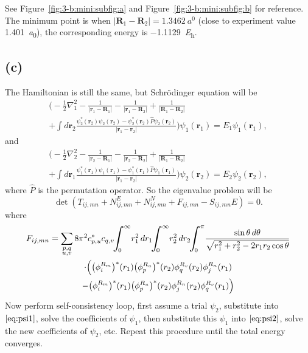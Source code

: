 See Figure~\ref{fig:3-b:mini:subfig:a} and Figure~\ref{fig:3-b:mini:subfig:b}
for reference. The minimum point is when
$\lvert \symbf{R}_1- \symbf{R}_2 \rvert = \qty{1.3462}{\bohr}$
(close to experiment value \qty{1.401}{\bohr}), the corresponding energy is \qty{-1.1129}{\hartree}.

\subsection*{(c)}

The Hamiltonian is still the same, but Schrödinger equation will be
%
\begin{multline}\label{eq:psi1}
    \biggl(-\frac{1}{2}\nabla_1^2
    - \frac{1}{\lvert \symbf{r}_1 - \symbf{R}_1 \rvert}
    - \frac{1}{\lvert \symbf{r}_1 - \symbf{R}_2 \rvert}
    + \frac{1}{\lvert \symbf{R}_1 - \symbf{R}_2 \rvert}\\
    + \int d\symbf{r}_2
    \frac{\psi_2^\ast (\symbf{r}_2) \psi_2(\symbf{r}_2) - \psi_2^\ast (\symbf{r}_2) \hat{P} \psi_2(\symbf{r}_2)}{\lvert \symbf{r}_1 - \symbf{r}_2 \rvert}
    \biggr)
    \psi_1(\symbf{r}_1) = E_1 \psi_1(\symbf{r}_1),
\end{multline}
%
and
%
\begin{multline}\label{eq:psi2}
    \biggl(-\frac{1}{2}\nabla_2^2
    - \frac{1}{\lvert \symbf{r}_2 - \symbf{R}_1 \rvert}
    - \frac{1}{\lvert \symbf{r}_2 - \symbf{R}_2 \rvert}
    + \frac{1}{\lvert \symbf{R}_1 - \symbf{R}_2 \rvert}\\
    + \int d\symbf{r}_1
    \frac{\psi_1^\ast (\symbf{r}_1) \psi_1(\symbf{r}_1) - \psi_1^\ast (\symbf{r}_1) \hat{P} \psi_1(\symbf{r}_1)}{\lvert \symbf{r}_1 - \symbf{r}_2 \rvert}
    \biggr)
    \psi_2(\symbf{r}_2) = E_2 \psi_2(\symbf{r}_2),
\end{multline}
%
where $\hat{P}$ is the permutation operator. So the eigenvalue problem will be
%
\begin{equation}
    \det(T_{ij, mn} + N^E_{ij, mn} + N^N_{ij, mn} + F_{ij, mn} - S_{ij, mn} E) = 0.
\end{equation}
%
where
%
\begin{multline}
    F_{ij, mn} = \sum_{\substack{p, q\\u, v}} 8\pi^2 c_{p, u}^\ast c_{q, v}
    \! \scaleint{7ex}_{\bs 0}^{\infty} r_1^2  \, dr_1
    \! \scaleint{7ex}_{\bs 0}^{\infty} r_2^2 \, dr_2
    \! \scaleint{7ex}_{\bs 0}^{\pi}
    \frac{\sin\theta\, d\theta}{\sqrt{r_1^2 + r_2^2 - 2 r_1 r_2 \cos\theta}}\\
    \cdot \Bigl(
    \bigl( \phi_i^{R_m} \bigr)^\ast(r_1) \bigl(\phi_p^{R_u} \bigr)^\ast(r_2) \phi_q^{R_v}(r_2)\phi_j^{R_n}(r_1)\\
    - \bigl( \phi_i^{R_m} \bigr)^\ast(r_1) \bigl(\phi_p^{R_u} \bigr)^\ast(r_2) \phi_j^{R_n}(r_2)\phi_q^{R_v}(r_1)
    \Bigr)
\end{multline}
%
Now perform self-consistency loop, first assume a trial $\psi_2$, substitute into
$\eqref{eq:psi1}$, solve the coefficients of $\psi_1$, then substitute this $\psi_1$
into $\eqref{eq:psi2}$, solve the new coefficients of $\psi_2$, etc. Repeat this procedure
until the total energy converges.
